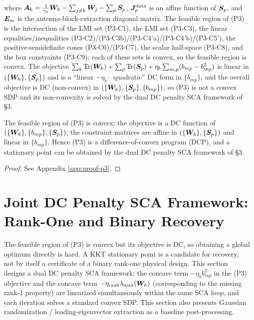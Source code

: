 where $\bm{A}_k = \frac{1}{\gamma_k} \bm{W}_k - \sum_{j \neq k} \bm{W}_j - \sum_{p} \bm{S}_p$, $\bm{J}_p^{\text{data}}$ is an affine function of $\bm{S}_p$, and $\bm{E}_m$ is the antenna-block-extraction diagonal matrix. The feasible region of (P3) is the intersection of the LMI set (P3-C1), the LMI set (P3-C3), the linear equalities/inequalities (P3-C2)/(P3-C3b)/(P3-C4'a)/(P3-C4'b)/(P3-C5'), the positive-semidefinite cones (P3-C6)/(P3-C7), the scalar half-space (P3-C8), and the box constraints (P3-C9); each of these sets is convex, so the feasible region is convex. The objective $\sum_k \operatorname{Tr}(\bm{W}_k) + \sum_p \operatorname{Tr}(\bm{S}_p) + \eta_b \sum_{m,p} (b_{mp} - b_{mp}^2)$ is linear in $(\{\bm{W}_k\}, \{\bm{S}_p\})$ and is a ``linear $-\eta_b \cdot$ quadratic'' DC form in $\{b_{mp}\}$, and the overall objective is DC (non-convex) in $(\{\bm{W}_k\}, \{\bm{S}_p\}, \{b_{mp}\})$, so (P3) is not a convex SDP and its non-convexity is solved by the dual DC penalty SCA framework of \S3.

\begin{theorem}\label{thm:p3-structure}
The feasible region of (P3) is convex; the objective is a DC function of $(\{\bm{W}_k\}, \{b_{mp}\}, \{\bm{S}_p\})$; the constraint matrices are affine in $(\{\bm{W}_k\}, \{\bm{S}_p\})$ and linear in $\{b_{mp}\}$. Hence (P3) is a difference-of-convex program (DCP), and a stationary point can be obtained by the dual DC penalty SCA framework of \S3.
\end{theorem}

\begin{proof}
See Appendix \ref{app:proof-p3}.
\end{proof}

\section{Joint DC Penalty SCA Framework: Rank-One and Binary Recovery}\label{sec:sca}

The feasible region of (P3) is convex but its objective is DC, so obtaining a
global optimum directly is hard. A KKT stationary point is a candidate for
recovery, not by itself a certificate of a binary rank-one physical design.
This section designs a dual DC penalty SCA framework: the concave term
$-\eta_b b_{mp}^2$ in the (P3) objective and the concave term
$-\eta_{\text{rank}} \lambda_{\max}(\bm{W}_k)$ (corresponding to the missing
rank-1 property) are linearized simultaneously within the same SCA loop, and
each iteration solves a standard convex SDP. This section also presents Gaussian
randomization / leading-eigenvector extraction as a baseline post-processing.

